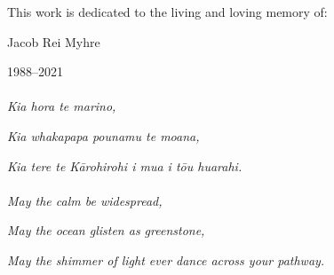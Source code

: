 This work is dedicated to the living and loving memory of:

Jacob Rei Myhre

1988--2021


\paragraph{}
\emph{Kia hora te marino,}

\emph{Kia whakapapa pounamu te moana,}

\emph{Kia tere te Kārohirohi i mua i tōu huarahi.}

\paragraph{}
\emph{May the calm be widespread,}

\emph{May the ocean glisten as greenstone,}

\emph{May the shimmer of light ever dance across your pathway.}